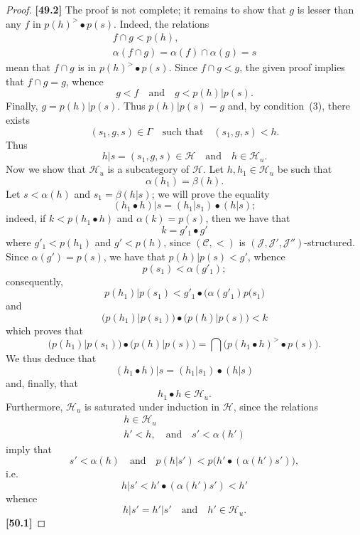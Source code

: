 \documentclass[a4paper,fleqn]{article}
\theoremstyle{plain}
\theoremstyle{definition}
\newenvironment{longcomm}[1]
  {\noindent\textbf{[#1]}\rmfamily}
  {}
\newcommand{\oldpage}[1]{{\marginpar{\footnotesize$\bigg\vert$\,\,\,\,\textit{p.~#1}}}}
\newcommand{\textand}{\quad\text{and}\quad}
\newcommand{\CC}{\mathcal{C}}
\newcommand{\HH}{\mathcal{H}}
\newcommand{\JJ}{\mathcal{J}}
\begin{document}
\begin{proof}
  \begin{longcomm}{49.2}
    The proof is not complete;
    it remains to show that $g$ is lesser than any $f$ in $p(h)^>\bullet p(s)$.
    Indeed, the relations
    \[
      \begin{gathered}
        f\cap g
        < p(h),
      \\\alpha(f\cap g)
        = \alpha(f)\cap\alpha(g)
        = s
      \end{gathered}
    \]
    mean that $f\cap g$ is in $p(h)^>\bullet p(s)$.
    Since $f\cap g<g$, the given proof implies that $f\cap g=g$, whence
    \[
      g<f
      \textand
      g < p(h)|p(s).
    \]
    Finally, $g=p(h)|p(s)$.
  \end{longcomm}
  Thus $p(h)|p(s)=g$ and, by condition~(3), there exists
  \[
    (s_1,g,s)\in\Gamma
    \quad\text{such that}\quad
    (s_1,g,s) < h.
  \]
  Thus
  \[
    h|s
    = (s_1,g,s)
    \in\HH
    \textand
    h\in\HH_u.
  \]
  Now we show that $\HH_u$ is a subcategory of $\HH$.
  Let $h,h_1\in\HH_u$ be such that
  \[
    \alpha(h_1)
    = \beta(h).
  \]
  Let $s<\alpha(h)$ and $s_1=\beta(h|s)$;
  we will prove the equality
  \[
    (h_1\bullet h)|s
    = (h_1|s_1)\bullet(h|s);
  \]
  indeed, if $k<p(h_1\bullet h)$ and $\alpha(k)=p(s)$, then we have that
  \[
    k = g'_1\bullet g'
  \]
  where $g'_1<p(h_1)$ and $g'<p(h)$, since $(\CC,<)$ is $(\JJ,\JJ',\JJ'')$-structured.
  \oldpage{378}
  Since $\alpha(g')=p(s)$, we have that $p(h)|p(s)<g'$, whence
  \[
    p(s_1)<\alpha(g'_1);
  \]
  consequently,
  \[
    p(h_1)|p(s_1)
    < g'_1\bullet\big(\alpha(g'_1)p(s_1\big)
  \]
  and
  \[\big(p(h_1)|p(s_1)\big)\bullet\big(p(h)|p(s)\big)
    < k
  \]
  which proves that
  \[
    \big(p(h_1)|p(s_1)\big)\bullet\big(p(h)|p(s)\big)
    = \bigcap \big(
      p(h_1\bullet h)^>\bullet p(s)
    \big).
  \]
  We thus deduce that
  \[
    (h_1\bullet h)|s
    = (h_1|s_1)\bullet(h|s)
  \]
  and, finally, that
  \[
    h_1\bullet h\in\HH_u.
  \]
  Furthermore, $\HH_u$ is saturated under induction in $\HH$, since the relations
  \[
    \begin{gathered}
      h\in\HH_u
    \\h'<h,
      \textand
      s'<\alpha(h')
    \end{gathered}
  \]
  imply that
  \[
    s'<\alpha(h)
    \textand
    p(h|s') < p\big(h'\bullet(\alpha(h')s')\big),
  \]
  i.e.
  \[
    h|s'
    < h'\bullet(\alpha(h')s')
    < h'
  \]
  whence
  \[
    h|s'
    = h'|s'
    \textand
    h'\in\HH_u.
  \]
  \begin{longcomm}{50.1}

\end{longcomm}
\end{proof}
\end{document}
